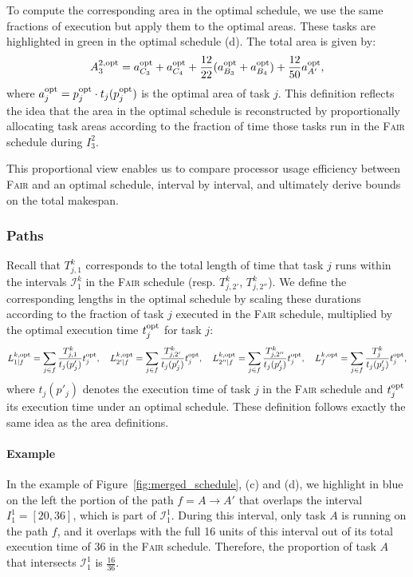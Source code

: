 \documentclass{article}
\newcommand\opt{\textnormal{opt}\xspace}
\begin{document}
To compute the corresponding area in the optimal schedule, we use the same fractions of execution but apply them to the optimal areas. These tasks are highlighted in green in the optimal schedule (d). The total area is given by:
\[
A_3^{2,\opt} = a_{C_3}^{\opt} + a_{C_4}^{\opt} + \frac{12}{22}(a_{B_3}^{\opt} + a_{B_4}^{\opt}) + \frac{12}{50} a_{A'}^{\opt},
\]
where $a_j^{\opt} = p_j^{\opt} \cdot t_j(p_j^{\opt})$ is the optimal area of task $j$. This definition reflects the idea that the area in the optimal schedule is reconstructed by proportionally allocating task areas according to the fraction of time those tasks run in the \textsc{Fair} schedule during $I_3^2$.

This proportional view enables us to compare processor usage efficiency between \textsc{Fair} and an optimal schedule, interval by interval, and ultimately derive bounds on the total makespan.


\subsubsection{Paths}
Recall that \(T_{j,1}^{k}\) corresponds to the total length of time that task \( j \) runs within the intervals \(\mathcal{I}_{1}^{k}\) in the \textsc{Fair} schedule (resp. \(T_{j,2'}^{k}\), \(T_{j,2''}^{k}\)).
We define the corresponding lengths in the optimal schedule by scaling these durations according to the fraction of task \( j \) executed in the \textsc{Fair} schedule, multiplied by the optimal execution time \( t_j^{\opt} \) for task \( j \):
\[
L^{k,\opt}_{1|f} = \sum_{j \in f} \frac{T_{j,1}^{k}}{t_j(p'_j)} t_j^{\opt},\quad
L^{k,\opt}_{2'|f} = \sum_{j \in f} \frac{T_{j,2'}^{k}}{t_j(p'_j)} t_j^{\opt},\quad
L^{k,\opt}_{2''|f} = \sum_{j \in f} \frac{T_{j,2''}^{k}}{t_j(p'_j)}  t_j^{\opt},\quad
L^{k,\opt}_{f} = \sum_{j \in f} \frac{T_{j}^{k}}{t_j(p'_j)}  t_j^{\opt},
\]
where \( t_j(p'_j) \) denotes the execution time of task \( j \) in the \textsc{Fair} schedule and \( t_j^{\opt} \) its execution time under an optimal schedule. These definition follows exactly the same idea as the area definitions.


\paragraph{Example}

In the example of Figure~\ref{fig:merged_schedule}, (c) and (d), we highlight in blue on the left the portion of the path \( f = A \rightarrow A' \) that overlaps the interval \( I_1^1 = [20,36] \), which is part of \(\mathcal{I}_1^1\). During this interval, only task \( A \) is running on the path \( f \), and it overlaps with the full 16 units of this interval out of its total execution time of 36 in the \textsc{Fair} schedule. Therefore, the proportion of task \( A \) that intersects \(\mathcal{I}_1^1\) is \(\frac{16}{36}\).
\end{document}
